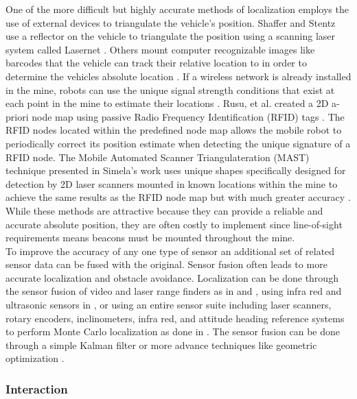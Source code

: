 One of the more difficult but highly accurate methods of localization employs the use of external devices to triangulate the vehicle's position. Shaffer and Stentz use a reflector on the vehicle to triangulate the position using a scanning laser system called Lasernet \cite{both}. Others mount computer recognizable images like barcodes that the vehicle can track their relative location to in order to determine the vehicles absolute location \cite{barcode}. If a wireless network is already installed in the mine, robots can use the unique signal strength conditions that exist at each point in the mine to estimate their locations \cite{signal}. Rusu, et al. created a 2D a-priori node map using passive Radio Frequency Identification (RFID) tags \cite{rfirusu}. The RFID nodes located within the predefined node map allows the mobile robot to periodically correct its position estimate when detecting the unique signature of a RFID node. The Mobile Automated Scanner Triangulateration (MAST) technique presented in Simela's work uses unique shapes specifically designed for detection by 2D laser scanners mounted in known locations within the mine to achieve the same results as the RFID node map but with much greater accuracy \cite{simela}. While these methods are attractive because they can provide a reliable and accurate absolute position, they are often costly to implement since line-of-sight requirements means beacons must be mounted throughout the mine.\\

To improve the accuracy of any one type of sensor an additional set of related sensor data can be fused with the original. Sensor fusion often leads to more accurate localization and obstacle avoidance. Localization can be done through the sensor fusion of video and laser range finders as in \cite{vis1} and \cite{vis2}, using infra red and ultrasonic sensors in \cite{irsonic}, or using an entire sensor suite including laser scanners, rotary encoders, inclinometers, infra red, and attitude heading reference systems to perform Monte Carlo localization as done in \cite{carlo}. The sensor fusion can be done through a simple Kalman filter or more advance techniques like geometric optimization \cite{geom}.\\

\subsubsection{Interaction}
\label{sec:interact}


